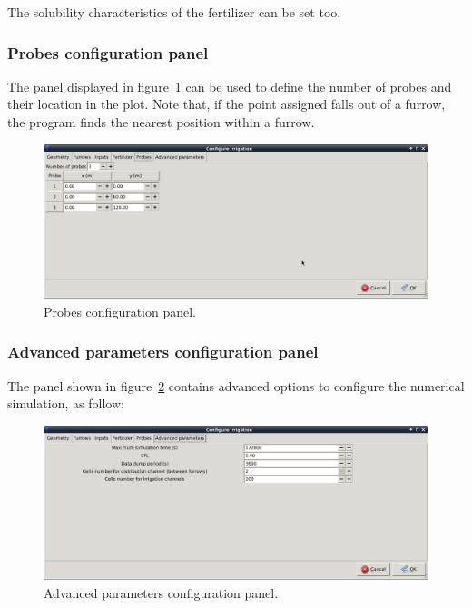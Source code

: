 \documentclass[review,authoryear]{elsarticle}
\begin{document}
The solubility characteristics of the fertilizer can be set too. 

\subsubsection{Probes configuration panel}

The panel displayed in figure~\ref{sondas} can be used to define the number of
probes and their location in the plot. Note that, if the point assigned falls
out of a furrow, the program finds the nearest position within a furrow.

\begin{figure}[!ht]
\begin{center}
\includegraphics[width=1125\UNIT]{confSondasEN.eps}
\caption{Probes configuration panel.}\label{sondas}
\end{center}
\end{figure}

\subsubsection{Advanced parameters configuration panel}

The panel shown in figure~\ref{param} contains advanced options to configure
the numerical simulation, as follow:

\begin{figure}[!ht]
\begin{center}
\includegraphics[width=1125\UNIT]{confParamEN.eps}
\caption{Advanced parameters configuration panel.}\label{param}
\end{center}
\end{figure}
\end{document}
